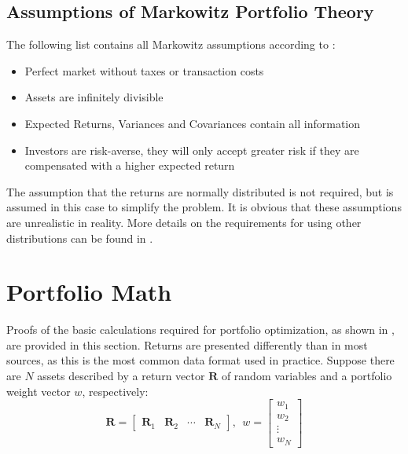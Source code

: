 \documentclass[
  oneside]{book}
\providecommand{\tightlist}{%
  \setlength{\itemsep}{0pt}\setlength{\parskip}{0pt}}
\begin{document}
\hypertarget{assumptions-of-markowitz-portfolio-theory}{%
\subsection{Assumptions of Markowitz Portfolio Theory}\label{assumptions-of-markowitz-portfolio-theory}}

The following list contains all Markowitz assumptions according to \citep{Mari2005}:

\vspace{-0.4cm}

\begin{itemize}
\tightlist
\item
  Perfect market without taxes or transaction costs
\item
  Assets are infinitely divisible
\item
  Expected Returns, Variances and Covariances contain all information
\item
  Investors are risk-averse, they will only accept greater risk if they
  are compensated with a higher expected return
\end{itemize}

The assumption that the returns are normally distributed is not required, but is assumed in this case to simplify the problem. It is obvious that these assumptions are unrealistic in reality. More details on the requirements for using other distributions can be found in \citep{Mari2005}.

\hypertarget{portfolio-math}{%
\section{Portfolio Math}\label{portfolio-math}}

Proofs of the basic calculations required for portfolio optimization, as shown in \citep{Eric2021}, are provided in this section. Returns are presented differently than in most sources, as this is the most common data format used in practice. Suppose there are \(N\) assets described by a return vector \(\pmb{R}\) of random variables and a portfolio weight vector \(w\), respectively:
\[
  \pmb{R} = 
  \begin{bmatrix}
    \pmb{R}_{1} & \pmb{R}_{2} & \cdots & \pmb{R}_{N}  
 \end{bmatrix}
 , \ \ 
 w = 
  \begin{bmatrix}
    w_{1} \\ 
    w_{2} \\
    \vdots \\
    w_{N}  
 \end{bmatrix}
\]
\end{document}
